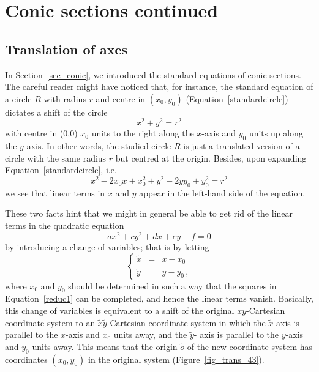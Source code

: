 \ifcourse
\section{Conic sections continued}\label{reductie_kegelsneden}
\subsection{Translation of axes}
\ifcourse
	\checkoddpage
{}
 \fi
In Section~\ref{sec_conic}, we introduced the standard equations of conic sections. The careful reader might have noticed that, for instance, the standard equation of a circle $R$ with radius $r$ and centre in $(x_0,y_0)$ (Equation~\eqref{standardcircle}) dictates a shift of the circle
$$
x^2 + y^2 = r^2
$$
with centre in (0,0) $x_0$ units to the right along the $x$-axis and $y_0$ units up along the $y$-axis. In other words, the studied circle $R$ is just a translated version of a circle with the same radius $r$ but centred at the origin. Besides, upon expanding Equation~\eqref{standardcircle}, i.e.
$$
x^2-2x_0x+x_0^2+y^2-2yy_0+y_0^2=r^2
$$
we see that linear terms in $x$ and $y$ appear in the left-hand side of the equation. 

These two facts hint that we might in general be able to get rid of the linear terms in the quadratic equation
\begin{equation}
ax^2+cy^2+dx+ey+f=0
\label{reduc1}
\end{equation}
by introducing a  change of variables; that is by letting
$$
\left\{\begin{array}{rcl}
\widetilde{x} & = & x-x_0\\[.2cm]
\widetilde{y} & = & y-y_0\,, 
\end{array}\right.
$$
where $x_0$ and $y_0$ should be determined in such a way that the squares in Equation~\eqref{reduc1} can be completed, and hence the linear terms vanish. Basically, this change of variables is equivalent to a shift  of the original $xy$-Cartesian coordinate system to an $\widetilde{x}\widetilde{y}$-Cartesian coordinate system in which the $\widetilde{x}$-axis is parallel to the $x$-axis and $x_0$ units away, and the $\widetilde{y}$- axis is parallel to the $y$-axis and $y_0$ units away. This means that the origin $\widetilde{o}$ of the new coordinate system has coordinates $(x_0, y_0)$ in the original system (Figure~\ref{fig_trans_43}). 




